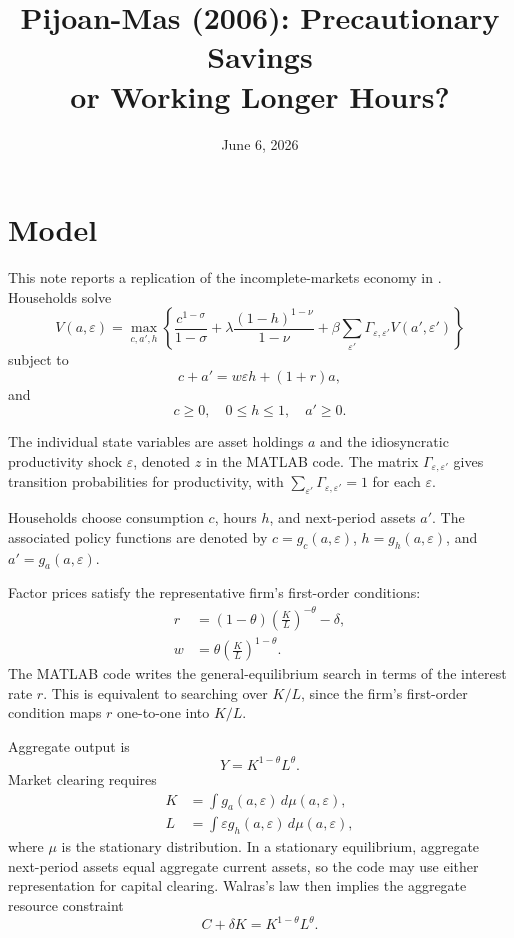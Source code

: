\documentclass[12pt]{article}
\title{Pijoan-Mas (2006): Precautionary Savings\\or Working Longer Hours?}
\author{}
\date{June 6, 2026}
\begin{document}
\maketitle

\section*{Model}

This note reports a replication of the incomplete-markets economy in \cite{pijoan2006}. Households solve
\begin{equation*}
V(a, \varepsilon) =
\max_{c, a', h}
\left\{
\frac{c^{1 - \sigma}}{1 - \sigma}
+ \lambda \frac{(1 - h)^{1 - \nu}}{1 - \nu}
+ \beta \sum_{\varepsilon'} \Gamma_{\varepsilon,\varepsilon'} V(a', \varepsilon')
\right\}
\end{equation*}
subject to
\begin{equation*}
c + a' = w \varepsilon h + (1 + r)a,
\end{equation*}
and
\begin{equation*}
c \geq 0, \quad 0 \leq h \leq 1, \quad a' \geq 0.
\end{equation*}

The individual state variables are asset holdings $a$ and the idiosyncratic productivity shock $\varepsilon$, denoted $z$ in the MATLAB code. The matrix $\Gamma_{\varepsilon,\varepsilon'}$ gives transition probabilities for productivity, with $\sum_{\varepsilon'} \Gamma_{\varepsilon,\varepsilon'} = 1$ for each $\varepsilon$.

Households choose consumption $c$, hours $h$, and next-period assets $a'$. The associated policy functions are denoted by $c = g_c(a,\varepsilon)$, $h = g_h(a,\varepsilon)$, and $a' = g_a(a,\varepsilon)$.

Factor prices satisfy the representative firm's first-order conditions:
\begin{align*}
r &= (1 - \theta) \left(\frac{K}{L}\right)^{-\theta} - \delta, \\
w &= \theta \left(\frac{K}{L}\right)^{1 - \theta}.
\end{align*}
The MATLAB code writes the general-equilibrium search in terms of the interest rate $r$. This is equivalent to searching over $K/L$, since the firm's first-order condition maps $r$ one-to-one into $K/L$.

Aggregate output is
\begin{equation*}
Y = K^{1 - \theta} L^{\theta}.
\end{equation*}
Market clearing requires
\begin{align*}
K &= \int g_a(a,\varepsilon) \, d\mu(a,\varepsilon), \\
L &= \int \varepsilon g_h(a,\varepsilon) \, d\mu(a,\varepsilon),
\end{align*}
where $\mu$ is the stationary distribution. In a stationary equilibrium, aggregate next-period assets equal aggregate current assets, so the code may use either representation for capital clearing. Walras's law then implies the aggregate resource constraint
\begin{equation*}
C + \delta K = K^{1 - \theta} L^{\theta}.
\end{equation*}
\end{document}
